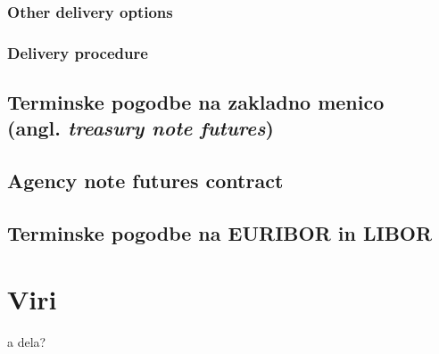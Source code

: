 \documentclass[a4paper, 12pt]{article}
\begin{document}
\subsubsection{Other delivery options}
\subsubsection{Delivery procedure}

\subsection{Terminske pogodbe na zakladno menico \\ (angl. \textit{treasury note futures})}
\subsection{Agency note futures contract}
\subsection{Terminske pogodbe na EURIBOR in LIBOR}

\section{Viri}
\begin{description}
    \item a dela?
\end{description}
\end{document}
